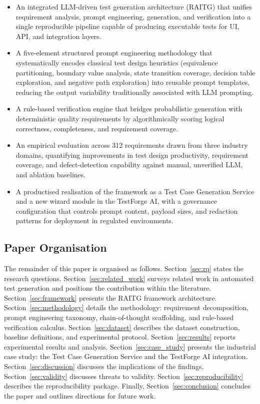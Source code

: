 \documentclass[conference]{IEEEtran}
\begin{document}
\begin{itemize}
\item An integrated LLM-driven test generation architecture (RAITG) that unifies requirement analysis, prompt engineering, generation, and verification into a single reproducible pipeline capable of producing executable tests for UI, API, and integration layers.
\item A five-element structured prompt engineering methodology that systematically encodes classical test design heuristics (equivalence partitioning, boundary value analysis, state transition coverage, decision table exploration, and negative path exploration) into reusable prompt templates, reducing the output variability traditionally associated with LLM prompting.
\item A rule-based verification engine that bridges probabilistic generation with deterministic quality requirements by algorithmically scoring logical correctness, completeness, and requirement coverage.
\item An empirical evaluation across 312 requirements drawn from three industry domains, quantifying improvements in test design productivity, requirement coverage, and defect-detection capability against manual, unverified LLM, and ablation baselines.
\item A productised realisation of the framework as a Test Case Generation Service and a new wizard module in the TestForge AI, with a governance configuration that controls prompt content, payload sizes, and redaction patterns for deployment in regulated environments.
\end{itemize}

\subsection{Paper Organisation}

The remainder of this paper is organised as follows.
Section~\ref{sec:rq} states the research questions.
Section~\ref{sec:related_work} surveys related work in automated test generation and positions the contribution within the literature.
Section~\ref{sec:framework} presents the RAITG framework architecture.
Section~\ref{sec:methodology} details the methodology: requirement decomposition, prompt engineering taxonomy, chain-of-thought scaffolding, and rule-based verification calculus.
Section~\ref{sec:dataset} describes the dataset construction, baseline definitions, and experimental protocol.
Section~\ref{sec:results} reports experimental results and analysis.
Section~\ref{sec:case_study} presents the industrial case study: the Test Case Generation Service and the TestForge AI integration.
Section~\ref{sec:discussion} discusses the implications of the findings.
Section~\ref{sec:validity} discusses threats to validity.
Section~\ref{sec:reproducibility} describes the reproducibility package.
Finally, Section~\ref{sec:conclusion} concludes the paper and outlines directions for future work.
\end{document}
